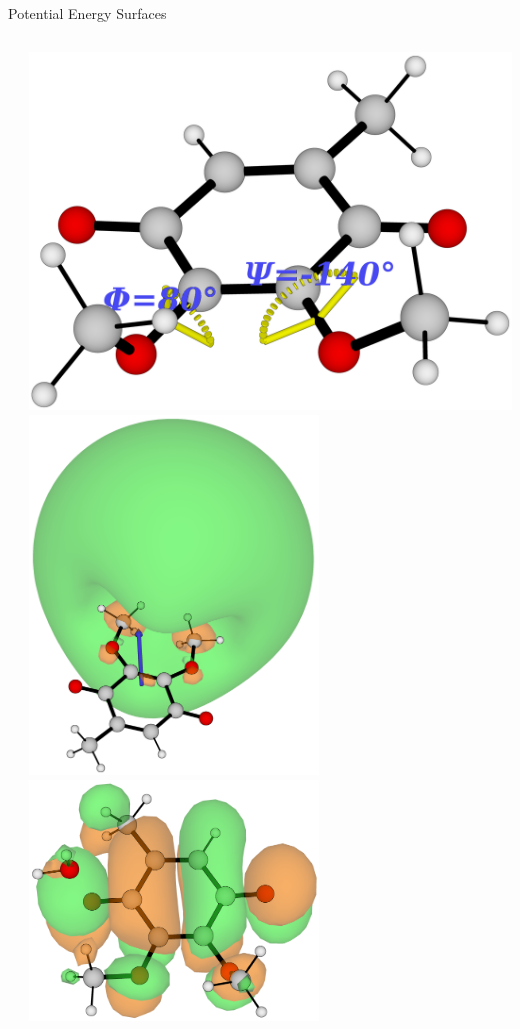 \documentclass[9pt,t,xcolor=table]{beamer}
\begin{document}
\begin{frame}{\huge Potential Energy Surfaces}\large
	\begin{columns}
		\begin{column}[c]{0.7\textwidth}
			\footnotesize
			
		\end{column}
		\begin{column}[c]{0.3\textwidth}
			\centering
			\includegraphics[width=\textwidth]{Figs/dihedrals.png}
			\includegraphics[width=0.6\textwidth]{Figs/Q0_181.png}
			\includegraphics[width=0.6\textwidth]{Figs/Q0_H2O_VBS.png}

\end{column}
\end{columns}
\end{frame}
\end{document}
